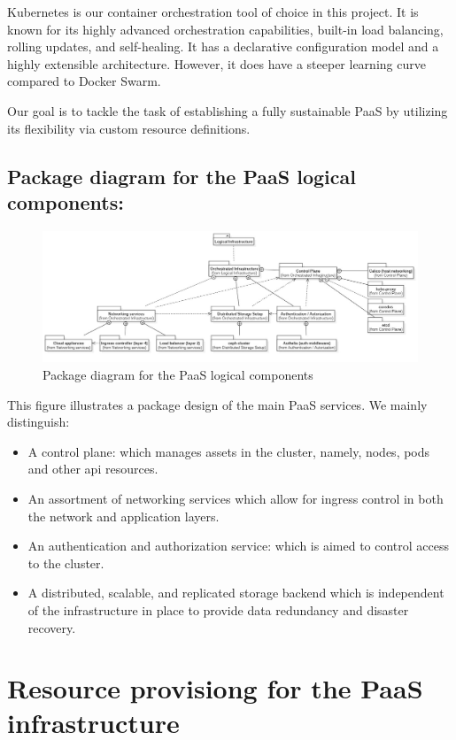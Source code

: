 Kubernetes is our container orchestration tool of choice in this project. It is known for its highly advanced orchestration capabilities, built-in load balancing, rolling updates, and self-healing. It has a declarative configuration model and a highly extensible architecture. However, it does have a steeper learning curve compared to Docker Swarm.  

Our goal is to tackle the task of establishing a fully sustainable PaaS by utilizing its flexibility via custom resource definitions. 


\subsection{Package diagram for the PaaS logical components:}

\begin{figure}[H]\centering
\includegraphics[width=1.0\textwidth,angle=00]{assets/f12.jpg}
\caption{Package diagram for the PaaS logical components}
\label{fig:Package diagram for the PaaS logical components}
\end{figure}

This figure illustrates a package design of the main PaaS services. We mainly distinguish: 
\begin{itemize}[label={--}]
\item  A control plane: which manages assets in the cluster, namely, nodes, pods and other api resources. 
\item An assortment of networking services which allow for ingress control in both the network and application layers. 
\item An authentication and authorization service: which is aimed to control access to the cluster. 
\item A distributed, scalable, and replicated storage backend which is independent of the infrastructure in place to provide data redundancy and disaster recovery. 
\end{itemize}
\newpage
\section{Resource provisiong for the PaaS infrastructure}

